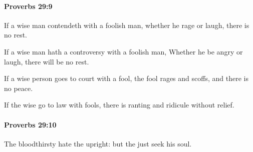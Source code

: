 		\paragraph{Proverbs 29:9} %
			\label{PROVERBS-29-9}

			If a wise man contendeth with a foolish man, whether he rage or laugh, there is no rest.

			\begin{versebox}
					\item[BHS] 
					\item[ASV] If a wise man hath a controversy with a foolish man, Whether he be angry or laugh, there will be no rest.
					\item[NIV] If a wise person goes to court with a fool, the fool rages and scoffs, and there is no peace.
					\item[NRSV] If the wise go to law with fools, there is ranting and ridicule without relief.
			\end{versebox}

		\paragraph{Proverbs 29:10} %
			\label{PROVERBS-29-10}

			The bloodthirsty hate the upright: but the just seek his soul.

